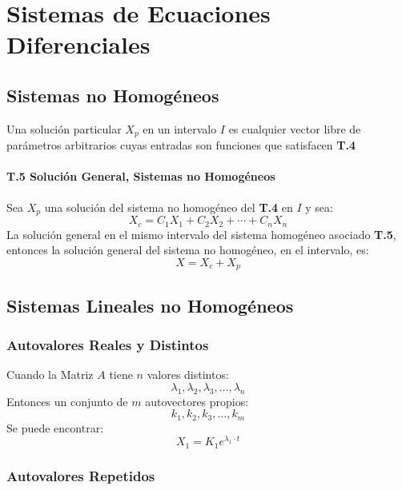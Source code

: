 \chapter{Sistemas de Ecuaciones Diferenciales}
\section{Sistemas no Homogéneos}
Una solución particular $X_p$ en un intervalo $I$ es cualquier vector libre de parámetros arbitrarios cuyas entradas son funciones que satisfacen \textbf{T.4}
\subsubsection{T.5 Solución General, Sistemas no Homogéneos}
Sea $X_p$ una solución del sistema no homogéneo del \textbf{T.4} en $I$ y sea: 
$$X_c=C_1 X_1 + C_2 X_2+\cdots +C_n X_n$$
La solución general en el mismo intervalo del sistema homogéneo asociado \textbf{T.5}, entonces la solución general del sistema no homogéneo, en el intervalo, es:
$$X=X_c + X_p$$
\section{Sistemas Lineales no Homogéneos}
\subsection{Autovalores Reales y Distintos}
Cuando la Matriz $A$ tiene $n$ valores distintos:
$$\lambda_1,\lambda_2,\lambda_3,\ldots ,\lambda_n$$
Entonces un conjunto de $m$ autovectores propios:
$$k_1,k_2,k_3,\ldots , k_m$$
Se puede encontrar:
$$X_1 = K_1 e^{\lambda_1 \cdot t}$$
\subsection{Autovalores Repetidos}